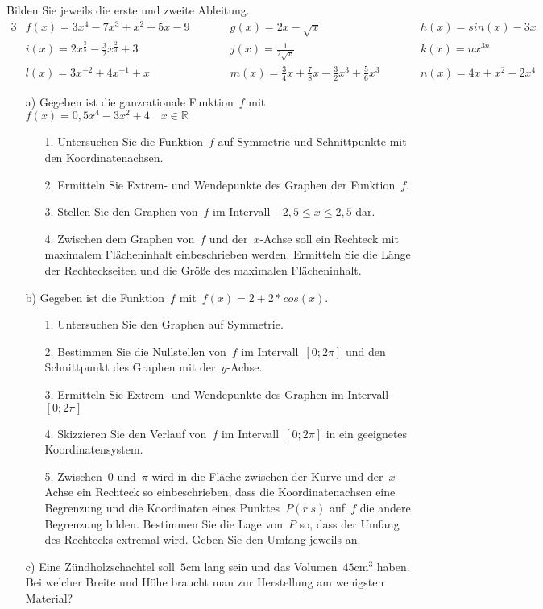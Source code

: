 


	Bilden Sie jeweils die erste und zweite Ableitung.
	\begin{alignat*}{3}
		&f(x)=3x^4-7x^3+x^2+5x-9 \qquad && g(x)=2x-\sqrt{x} && h(x)=sin(x)-3x\\
		&i(x)=2x^{\frac{3}{5}}-\frac{3}{2}x^{\frac{2}{3}}+3 && j(x)=\frac{1}{2\sqrt{x}} && k(x)=nx^{3n}\\
		&l(x)=3x^{-2}+4x^{-1}+x && m(x)=\frac{3}{4}x+\frac{7}{8}x-\frac{3}{2}x^3+\frac{5}{6}x^3 \qquad && n(x)=4x+x^2-2x^4
	\end{alignat*}
	\begin{itemize}
		\item[a)] Gegeben ist die ganzrationale Funktion~$f$ mit~$f(x)=0,5x^4-3x^2+4 \quad x \in \mathbb{R}$
	\begin{itemize}
		\item[1.] Untersuchen Sie die Funktion~$f$ auf Symmetrie und Schnittpunkte mit den Koordinatenachsen.
		\item[2.] Ermitteln Sie Extrem- und Wendepunkte des Graphen der Funktion~$f$.
		\item[3.] Stellen Sie den Graphen von~$f$ im Intervall $-2,5\le x \le2,5$ dar.
		\item[4.] Zwischen dem Graphen von~$f$ und der~$x$-Achse soll ein Rechteck mit maximalem Flächeninhalt einbeschrieben werden. Ermitteln Sie die Länge der Rechteckseiten und die Größe des maximalen Flächeninhalt.
	\end{itemize}

		\item[b)] Gegeben ist die Funktion~$f$ mit~$f(x)=2+2*cos(x)$.
	\begin{itemize}
		\item[1.] Untersuchen Sie den Graphen auf Symmetrie.
		\item[2.] Bestimmen Sie die Nullstellen von~$f$ im Intervall~$\left[0;2\pi\right]$ und den Schnittpunkt des Graphen mit der~$y$-Achse.
		\item[3.]Ermitteln Sie Extrem- und Wendepunkte des Graphen im Intervall~$[0;2\pi]$
		\item[4.]Skizzieren Sie den Verlauf von~$f$ im Intervall~$\left[0;2\pi\right]$ in ein geeignetes Koordinatensystem.
		\item[5.]Zwischen~$0$ und~$\pi$ wird in die Fläche zwischen der Kurve und der~$x$-Achse ein Rechteck so einbeschrieben, dass die Koordinatenachsen eine Begrenzung und die Koordinaten eines Punktes~$P\left(r|s\right)$ auf~$f$ die andere Begrenzung bilden. Bestimmen Sie die Lage von~$P$ so, dass der Umfang des Rechtecks extremal wird. Geben Sie den Umfang jeweils an.
	\end{itemize}
	\item[c)] Eine Zündholzschachtel soll~$5\mathrm{cm}$ lang sein und das Volumen~$45\mathrm{cm}^3$ haben. Bei welcher Breite und Höhe braucht man zur Herstellung am wenigsten Material?
	\end{itemize}



